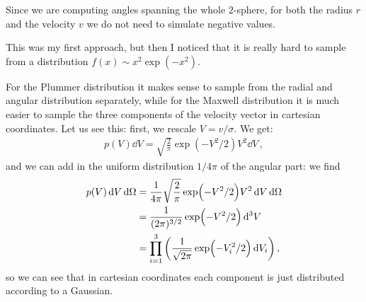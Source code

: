 \documentclass[main.tex]{subfiles}
\begin{document}
Since we are computing angles spanning the whole \(2\)-sphere, for both the radius \(r\) and the velocity \(v\) we do not need to simulate negative values.

This was my first approach, but then I noticed that it is really hard to sample from a distribution \(f(x) \sim x^2 \exp(-x^2)\). 

For the Plummer distribution it makes sense to sample from the radial and angular distribution separately, while for the Maxwell distribution it is much easier to sample the three components of the velocity vector in cartesian coordinates. Let us see this: first, we rescale \(V = v/\sigma \). We get: 
%
\begin{align}
  p(V) \dd{V} = \sqrt{\frac{2}{\pi }} \exp(- V^2/2)V^2 \dd{V}
\,,
\end{align}
%
and we can add in the uniform distribution \(1/ 4\pi \) of the angular part: we find 
%
\begin{subequations}
\begin{align}
p(V) \dd{V} \dd{\Omega } &= \frac{1}{4 \pi } \sqrt{\frac{2}{\pi }} \exp(-V^2/2) V^2 \dd{V} \dd{\Omega }  \\
&= \frac{1}{(2 \pi )^{3/2}} \exp(-V^2/2) \dd[3]{V}  \\
&= \prod_{i=1}^{3} \qty(\frac{1}{\sqrt{2 \pi }} \exp(-V_i^2/2) \dd{V_i})
\,,
\end{align}
\end{subequations}
%
so we can see that in cartesian coordinates each component is just distributed according to a Gaussian. 
\end{document}
